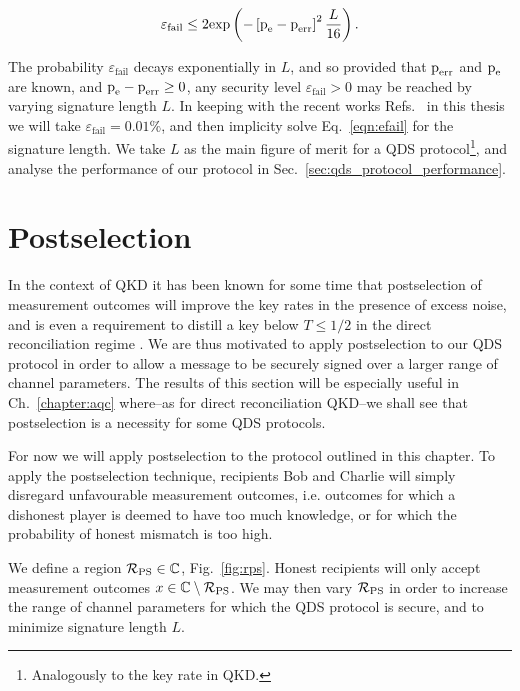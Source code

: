 \begin{equation}\label{eqn:efail}
\varepsilon_{\text{fail}} \le 2 \text{exp}\left( - \left[\text{p}_{\text{e}} - \text{p}_{\text{err}}\right]^2 \frac{L}{16}\right).
\end{equation}

\noindent The probability $\varepsilon_{\text{fail}}$ decays exponentially in $L$, and so provided that $\text{p}_{\text{err}}$ and $\text{p}_{\text{e}}$ are known, and $\text{p}_{\text{e}} - \text{p}_{\text{err}} \ge 0$, any security level $\varepsilon_{\text{fail}} > 0 $ may be reached by varying signature length $L$. In keeping with the recent works Refs.~\cite{Collins2014, Croal2016, Donaldson2016, Amiri2016} in this thesis we will take $\varepsilon_{\text{fail}} = 0.01\%$, and then implicity solve Eq.~\ref{eqn:efail} for the signature length. We take $L$ as the main figure of merit for a QDS protocol\footnote{Analogously to the key rate in QKD.}, and analyse the performance of our protocol in Sec.~\ref{sec:qds_protocol_performance}.



\section{Postselection}
In the context of QKD it has been known for some time that postselection of measurement outcomes will improve the key rates in the presence of excess noise, and is even a requirement to distill a key below $T \le 1/2$ in the direct reconciliation regime \cite{Silberhorn2002}. We are thus motivated to apply postselection to our QDS protocol in order to allow a message to be securely signed over a larger range of channel parameters. The results of this section will be especially useful in Ch.~\ref{chapter:aqc} where--as for direct reconciliation QKD--we shall see that postselection is a necessity for some QDS protocols.

For now we will apply postselection to the protocol outlined in this chapter. To apply the postselection technique, recipients Bob and Charlie will simply disregard unfavourable measurement outcomes, i.e. outcomes for which a dishonest player is deemed to have too much knowledge, or for which the probability of honest mismatch is too high.

We define a region $\mathcal{R}_{\text{PS}} \in \mathbb{C}$, Fig.~\ref{fig:rps}. Honest recipients will only accept measurement outcomes $x \in \mathbb{C}\setminus\mathcal{R}_{\text{PS}}$. We may then vary $\mathcal{R}_{\text{PS}}$ in order to increase the range of channel parameters for which the QDS protocol is secure, and to minimize signature length $L$.

